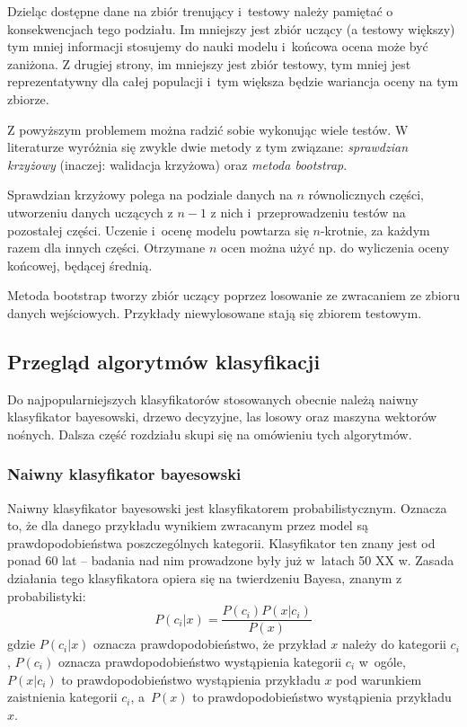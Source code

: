 \documentclass[../thesis.tex]{subfiles}
\begin{document}
Dzieląc dostępne dane na zbiór trenujący i~testowy należy pamiętać o konsekwencjach tego podziału. Im mniejszy jest zbiór uczący (a testowy większy) tym mniej informacji stosujemy do nauki modelu i~końcowa ocena może być zaniżona. Z drugiej strony, im mniejszy jest zbiór testowy, tym mniej jest reprezentatywny dla całej populacji i~tym większa będzie wariancja oceny na tym zbiorze. 

Z  powyższym problemem można radzić sobie wykonując wiele testów. W literaturze wyróżnia się zwykle dwie metody z tym związane: \emph{sprawdzian krzyżowy} (inaczej: walidacja krzyżowa) oraz \emph{metoda bootstrap}.

Sprawdzian krzyżowy polega na podziale danych na $n$ równolicznych części, utworzeniu danych uczących z $n-1$ z nich i~przeprowadzeniu testów na pozostałej części. Uczenie i~ocenę modelu powtarza się $n$-krotnie, za każdym razem dla innych części. Otrzymane $n$ ocen można użyć np. do wyliczenia oceny końcowej, będącej średnią. 

Metoda bootstrap tworzy zbiór uczący poprzez losowanie ze zwracaniem ze zbioru danych wejściowych. Przykłady niewylosowane stają się zbiorem testowym.

\subsection{Przegląd algorytmów klasyfikacji}

Do najpopularniejszych klasyfikatorów stosowanych obecnie należą naiwny klasyfikator bayesowski, drzewo decyzyjne, las losowy oraz maszyna wektorów nośnych. Dalsza część rozdziału skupi się na omówieniu tych algorytmów.

\subsubsection{Naiwny klasyfikator bayesowski}

Naiwny klasyfikator bayesowski jest klasyfikatorem probabilistycznym. Oznacza to, że dla danego przykładu wynikiem zwracanym przez model są prawdopodobieństwa poszczególnych kategorii. Klasyfikator ten znany jest od ponad 60 lat – badania nad nim prowadzone były już w~latach 50 XX w. Zasada działania tego klasyfikatora opiera się na twierdzeniu Bayesa, znanym z probabilistyki:
\[P(c_i|x) = \frac{P(c_i)P(x|c_i)}{P(x)}\]
gdzie $P(c_i|x)$ oznacza prawdopodobieństwo, że przykład $x$ należy do kategorii $c_i$, $P(c_i)$ oznacza prawdopodobieństwo wystąpienia kategorii $c_i$ w~ogóle, $P(x|c_i)$ to prawdopodobieństwo wystąpienia przykładu $x$ pod warunkiem zaistnienia kategorii $c_i$, a~$P(x)$ to prawdopodobieństwo wystąpienia przykładu $x$.
\end{document}
